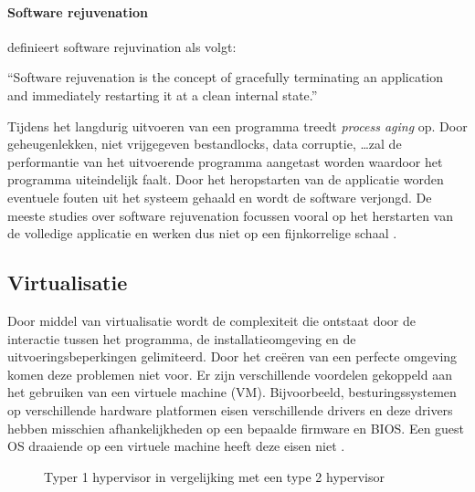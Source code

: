 \paragraph{Software rejuvenation}
\citet{huang1995software} definieert software rejuvination als volgt:
\begin{displayquote}
``Software rejuvenation is the concept of gracefully terminating an application and immediately restarting it at a clean internal state.''
\end{displayquote}
Tijdens het langdurig uitvoeren van een programma treedt \emph{process aging} op.
Door geheugenlekken, niet vrijgegeven bestandlocks, data corruptie, \ldots zal de performantie van het uitvoerende programma aangetast worden waardoor het programma uiteindelijk faalt.
Door het heropstarten van de applicatie worden eventuele fouten uit het systeem gehaald en wordt de software verjongd.
De meeste studies over software rejuvenation focussen vooral op het herstarten van de volledige applicatie en werken dus niet op een fijnkorrelige schaal \citep{srinivasan2004flashback}.

\subsection{Virtualisatie}\label{sec:virtualisatie}
Door middel van virtualisatie wordt de complexiteit die ontstaat door de interactie tussen het programma, de installatieomgeving en de uitvoeringsbeperkingen gelimiteerd.
Door het creëren van een perfecte omgeving komen deze problemen niet voor.
Er zijn verschillende voordelen gekoppeld aan het gebruiken van een virtuele machine (VM).
Bijvoorbeeld, besturingssystemen op verschillende hardware platformen eisen verschillende drivers en deze drivers hebben misschien afhankelijkheden op een bepaalde firmware en BIOS.
Een guest OS draaiende op een virtuele machine heeft deze eisen niet \citep{shumate2004implications}.

\begin{figure}[!ht]
\centering
{}
\caption{Typer 1 hypervisor in vergelijking met een type 2 hypervisor \citep{hypervisors}}
\label{fig:hypervisors}
\end{figure}

